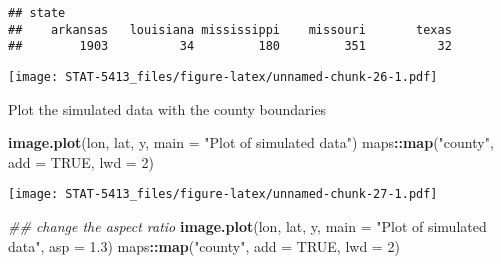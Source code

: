 \documentclass[]{book}
\newenvironment{Shaded}{\begin{snugshade}}{\end{snugshade}}
\newcommand{\CommentTok}[1]{\textcolor[rgb]{0.56,0.35,0.01}{\textit{#1}}}
\newcommand{\DataTypeTok}[1]{\textcolor[rgb]{0.13,0.29,0.53}{#1}}
\newcommand{\DecValTok}[1]{\textcolor[rgb]{0.00,0.00,0.81}{#1}}
\newcommand{\FloatTok}[1]{\textcolor[rgb]{0.00,0.00,0.81}{#1}}
\newcommand{\KeywordTok}[1]{\textcolor[rgb]{0.13,0.29,0.53}{\textbf{#1}}}
\newcommand{\NormalTok}[1]{#1}
\newcommand{\OperatorTok}[1]{\textcolor[rgb]{0.81,0.36,0.00}{\textbf{#1}}}
\newcommand{\OtherTok}[1]{\textcolor[rgb]{0.56,0.35,0.01}{#1}}
\newcommand{\StringTok}[1]{\textcolor[rgb]{0.31,0.60,0.02}{#1}}
\begin{document}
\begin{verbatim}
## state
##    arkansas   louisiana mississippi    missouri       texas 
##        1903          34         180         351          32
\end{verbatim}

\begin{Shaded}
\end{Shaded}

\texttt{[image: STAT-5413\_files/figure-latex/unnamed-chunk-26-1.pdf]}

Plot the simulated data with the county boundaries

\begin{Shaded}
\begin{Highlighting}[]
\KeywordTok{image.plot}\NormalTok{(lon, lat, y, }\DataTypeTok{main =} \StringTok{"Plot of simulated data"}\NormalTok{)}
\NormalTok{maps}\OperatorTok{::}\KeywordTok{map}\NormalTok{(}\StringTok{"county"}\NormalTok{, }\DataTypeTok{add =} \OtherTok{TRUE}\NormalTok{, }\DataTypeTok{lwd =} \DecValTok{2}\NormalTok{)}
\end{Highlighting}
\end{Shaded}

\texttt{[image: STAT-5413\_files/figure-latex/unnamed-chunk-27-1.pdf]}

\begin{Shaded}
\begin{Highlighting}[]
\CommentTok{## change the aspect ratio}
\KeywordTok{image.plot}\NormalTok{(lon, lat, y, }\DataTypeTok{main =} \StringTok{"Plot of simulated data"}\NormalTok{, }\DataTypeTok{asp =} \FloatTok{1.3}\NormalTok{)}
\NormalTok{maps}\OperatorTok{::}\KeywordTok{map}\NormalTok{(}\StringTok{"county"}\NormalTok{, }\DataTypeTok{add =} \OtherTok{TRUE}\NormalTok{, }\DataTypeTok{lwd =} \DecValTok{2}\NormalTok{)}
\end{Highlighting}
\end{Shaded}
\end{document}
